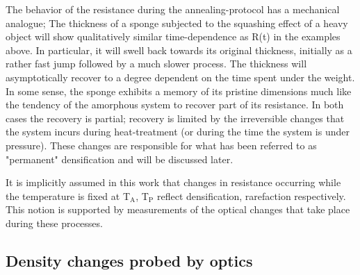\documentclass
[preprint,showpacs,byrevtex,10pt,twocolumn,tightenlines,prl,letterpaper]{revtex4}%
\begin{document}
The behavior of the resistance during the annealing-protocol has a mechanical
analogue; The thickness of a sponge subjected to the squashing effect of a
heavy object will show qualitatively similar time-dependence as R(t) in the
examples above. In particular, it will swell back towards its original
thickness, initially as a rather fast jump followed by a much slower process.
The thickness will asymptotically recover to a degree dependent on the time
spent under the weight. In some sense, the sponge exhibits a memory of its
pristine dimensions much like the tendency of the amorphous system to recover
part of its resistance. In both cases the recovery is partial; recovery is
limited by the irreversible changes that the system incurs during
heat-treatment (or during the time the system is under pressure). These
changes are responsible for what has been referred to as "permanent"
densification \cite{1,2,3,4,5,7,8,9} and will be discussed later.

It is implicitly assumed in this work that changes in resistance occurring
while the temperature is fixed at T$_{\text{A}}$, T$_{\text{P}}$ reflect
densification, rarefaction respectively. This notion is supported by
measurements of the optical changes that take place during these processes.

\subsection{Density changes probed by optics}
\end{document}
